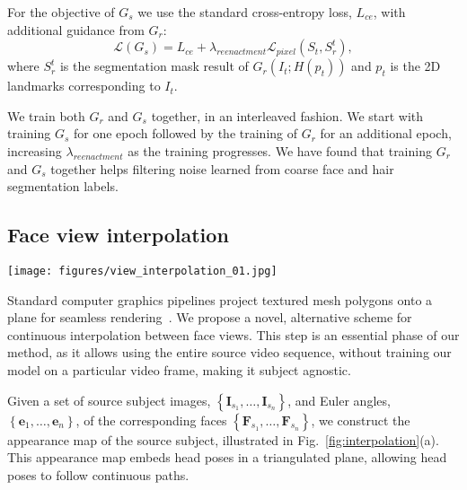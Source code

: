 For the objective of $G_s$ we use the standard cross-entropy loss, $L_{ce}$, with additional guidance from $G_r$:
\begin{equation}
\mathcal{L}(G_s)=L_{ce}+\lambda_{reenactment}\mathcal{L}_{pixel}(S_t,S_r^t),
\end{equation}
where $S_r^t$ is the segmentation mask result of $G_r(I_t;H(p_t))$ and $p_t$ is the 2D landmarks corresponding to $I_t$. 

We train both $G_r$ and $G_s$ together, in an interleaved fashion. We start with training $G_s$ for one epoch followed by the training of $G_r$ for an additional epoch, increasing $\lambda_{reenactment}$ as the training progresses. We have found that training $G_r$ and $G_s$ together helps filtering noise learned from coarse face and hair segmentation labels.

\subsection{Face view interpolation}
\label{subsec:FaceViewInterpolation}
\begin{figure*}[t]
\centering
\texttt{[image: figures/view\_interpolation\_01.jpg]}\vspace{-3mm}
\caption{
{\em Face view interpolation.} (a) Shows an example of an appearance map of the source subject (Donald Trump). The green dots represent different views of the source subject, the blue lines represent the Delaunay Triangulation of those views, and the red X marks the location of the current target's pose. (b) The interpolated views associated with the vertices of the selected triangle (represented by the yellow dots). (c) The reenactment result and the current target image. \vspace{-4mm} }\label{fig:interpolation}
\end{figure*}
Standard computer graphics pipelines project textured mesh polygons onto a plane for seamless rendering~\cite{hughes2014computer}. We propose a novel, alternative scheme for continuous interpolation between face views. This step is an essential phase of our method, as it allows using the entire source video sequence, without training our model on a particular video frame, making it subject agnostic.

Given a set of source subject images, $\left\{ \mathbf{I}%
_{s_{1}},\dots ,\mathbf{I}_{s_{n}}\right\}$, and Euler angles, $\left\{
\mathbf{e}_{1},\dots ,\mathbf{e}_{n}\right\}$, of the corresponding faces $\left\{ \mathbf{F}_{s_{1}},\dots ,\mathbf{F}_{s_{n}}\right\}$, we construct
the appearance map of the source subject, illustrated in Fig.~\ref{fig:interpolation}(a). This appearance map embeds head poses in a triangulated plane, allowing head poses to follow continuous paths. 

